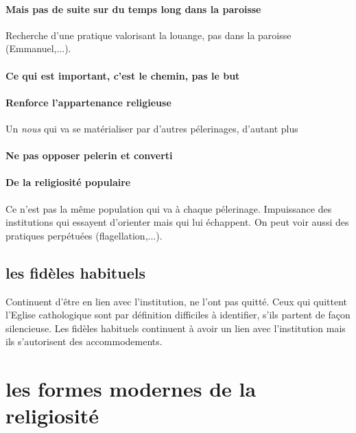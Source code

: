 \paragraph{Mais pas de suite sur du temps long dans la paroisse} Recherche d'une pratique valorisant la louange, pas dans la paroisse (Emmanuel,...).


\paragraph{Ce qui est important, c'est le chemin, pas le but}

\paragraph{Renforce l'appartenance religieuse} Un \textit{nous} qui va se matérialiser par d'autres pélerinages, d'autant plus 




\paragraph{Ne pas opposer pelerin et converti}




\paragraph{De la religiosité populaire} Ce n'est pas la même population qui va à chaque pélerinage. Impuissance des institutions qui essayent d'orienter mais qui lui échappent.
On peut voir aussi des pratiques perpétuées (flagellation,...). 



\subsection{les fidèles habituels}
Continuent d'être en lien avec l'institution, ne l'ont pas quitté.
Ceux qui quittent l'Eglise cathologique sont par définition difficiles à identifier, s'ils partent de façon silencieuse. 
Les fidèles habituels continuent à avoir un lien avec l'institution mais ils s'autorisent des accommodements.

\section{les formes modernes de la religiosité }


